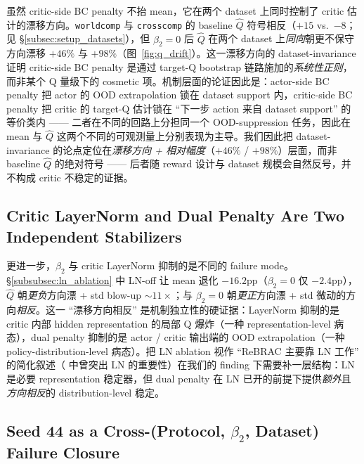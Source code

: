 虽然 critic-side BC penalty 不抬 mean，它在两个 dataset 上同时控制了 critic 估计的漂移方向。\texttt{worldcomp} 与 \texttt{crosscomp} 的 baseline $\hat{Q}$ 符号相反（$+15$ vs.\ $-8$；见 \S\ref{subsec:setup_datasets}），但 $\beta_2 = 0$ 后 $\hat{Q}$ 在两个 dataset 上\emph{同向}朝更不保守方向漂移 $+46\%$ 与 $+98\%$（图~\ref{fig:q_drift}）。这一漂移方向的 dataset-invariance 证明 critic-side BC penalty 是通过 target-Q bootstrap 链路施加的\emph{系统性正则}，而非某个 Q 量级下的 cosmetic 项。机制层面的论证因此是：actor-side BC penalty 把 actor 的 OOD extrapolation 锁在 dataset support 内，critic-side BC penalty 把 critic 的 target-Q 估计锁在 ``下一步 action 来自 dataset support'' 的等价类内 —— 二者在不同的回路上分担同一个 OOD-suppression 任务，因此在 mean 与 $\hat{Q}$ 这两个不同的可观测量上分别表现为主导。我们因此把 dataset-invariance 的论点定位在\emph{漂移方向 + 相对幅度}（$+46\%$ / $+98\%$）层面，而非 baseline $\hat{Q}$ 的绝对符号 —— 后者随 reward 设计与 dataset 规模会自然反号，并不构成 critic 不稳定的证据。

\subsection{Critic LayerNorm and Dual Penalty Are Two Independent Stabilizers}\label{subsec:discussion_ln_orthogonal}

更进一步，$\beta_2$ 与 critic LayerNorm 抑制的是不同的 failure mode。\S\ref{subsubsec:ln_ablation} 中 LN-off 让 mean 退化 $-16.2$pp（$\beta_2 = 0$ 仅 $-2.4$pp），$\hat{Q}$ 朝\emph{更负}方向漂 + std blow-up $\sim 11\times$；与 $\beta_2 = 0$ 朝\emph{更正}方向漂 + std 微动的方向\emph{相反}。这一 ``漂移方向相反'' 是机制独立性的硬证据：LayerNorm 抑制的是 critic 内部 hidden representation 的局部 Q 爆炸（一种 representation-level 病态），dual penalty 抑制的是 actor / critic 输出端的 OOD extrapolation（一种 policy-distribution-level 病态）。把 LN ablation 视作 ``ReBRAC 主要靠 LN 工作'' 的简化叙述（\citet{tarasov2023rebrac} 中曾突出 LN 的重要性）在我们的 finding 下需要补一层结构：LN 是必要 representation 稳定器，但 dual penalty 在 LN 已开的前提下提供\emph{额外}且\emph{方向相反}的 distribution-level 稳定。

\subsection{Seed 44 as a Cross-(Protocol, $\beta_2$, Dataset) Failure Closure}\label{subsec:discussion_seed44_closure}

